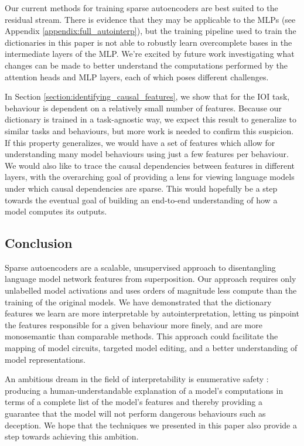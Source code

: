 Our current methods for training sparse autoencoders are best suited to the residual stream. There is evidence that they may be applicable to the MLPs (see Appendix \ref{appendix:full_autointerp}), but the training pipeline used to train the dictionaries in this paper is not able to robustly learn overcomplete bases in the intermediate layers of the MLP. We're excited by future work investigating what changes can be made to better understand the computations performed by the attention heads and MLP layers, each of which poses different challenges.

In Section \ref{section:identifying_causal_features}, we show that for the IOI task, behaviour is dependent on a relatively small number of features. Because our dictionary is trained in a task-agnostic way, we expect this result to generalize to similar tasks and behaviours, but more work is needed to confirm this suspicion. If this property generalizes, we would have a set of features which allow for understanding many model behaviours using just a few features per behaviour. We would also like to trace the causal dependencies between features in different layers, with the overarching goal of providing a lens for viewing language models under which causal dependencies are sparse. This would hopefully be a step towards the eventual goal of building an end-to-end understanding of how a model computes its outputs.


\subsection{Conclusion}

Sparse autoencoders are a scalable, unsupervised approach to disentangling language model network features from superposition. Our approach requires only unlabelled model activations and uses orders of magnitude less compute than the training of the original models. We have demonstrated that the dictionary features we learn are more interpretable by autointerpretation, letting us pinpoint the features responsible for a given behaviour more finely, and are more monosemantic than comparable methods. This approach could facilitate the mapping of model circuits, targeted model editing, and a better understanding of model representations.

An ambitious dream in the field of interpretability is enumerative safety \citep{elhage2022toy}: producing a human-understandable explanation of a model's computations in terms of a complete list of the model's features and thereby providing a guarantee that the model will not perform dangerous behaviours such as deception. We hope that the techniques we presented in this paper also provide a step towards achieving this ambition.

